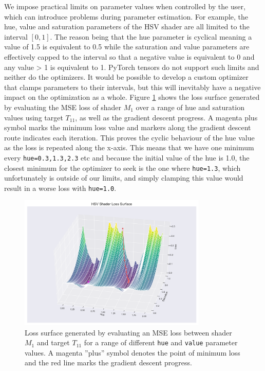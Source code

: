 We impose practical limits on parameter values when controlled by the user, which can introduce problems during parameter estimation. For example, the hue, value and saturation parameters of the HSV shader are all limited to the interval $[0,1]$. The reason being that the hue parameter is cyclical meaning a value of 1.5 is equivalent to 0.5 while the saturation and value parameters are effectively capped to the interval so that a negative value is equivalent to 0 and any value > 1 is equivalent to 1. PyTorch tensors do not support such limits and neither do the optimizers. It would be possible to develop a custom optimizer that clamps parameters to their intervals, but this will inevitably have a negative impact on the optimization as a whole. Figure \ref{fig:HSVShaderLossSurface} shows the loss surface generated by evaluating the MSE loss of shader $M_1$ over a range of hue and saturation values using target $T_{11}$, as well as the gradient descent progress. A magenta plus symbol marks the minimum loss value and markers along the gradient descent route indicates each iteration. This proves the cyclic behaviour of the hue value as the loss is repeated along the x-axis. This means that we have one minimum every \texttt{hue=0.3,1.3,2.3} etc and because the initial value of the hue is 1.0, the closest minimum for the optimizer to seek is the one where \texttt{hue=1.3}, which unfortunately is outside of our limits, and simply clamping this value would result in a worse loss with \texttt{hue=1.0}.

\begin{figure}[h]
    \centering
    \includegraphics[width=0.8\textwidth]{img/evaluation/HSV Shader Loss Surface.pdf}
    \caption{Loss surface generated by evaluating an MSE loss between shader $M_1$ and target $T_{11}$ for a range of different \texttt{hue} and \texttt{value} parameter values. A magenta ''plus'' symbol denotes the point of minimum loss and the red line marks the gradient descent progress.}
    \label{fig:HSVShaderLossSurface}
\end{figure}
